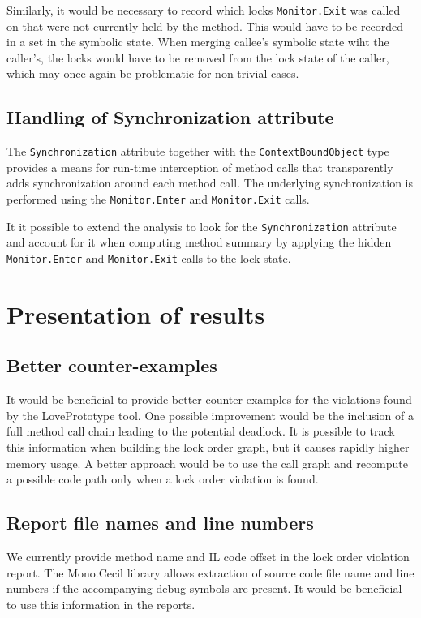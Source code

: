 Similarly, it would be necessary to record which locks \texttt{Monitor.Exit} was called on that were not currently held by the method. This would have to be recorded in a set in the symbolic state. When merging callee's symbolic state wiht the caller's, the locks would have to be removed from the lock state of the caller, which may once again be problematic for non-trivial cases.

\subsection{Handling of Synchronization attribute}

The \texttt{Synchronization} attribute together with the \texttt{ContextBoundObject} type provides a means for run-time interception of method calls that transparently adds synchronization around each method call. The underlying synchronization is performed using the \texttt{Monitor.Enter} and \texttt{Monitor.Exit} calls.

It it possible to extend the analysis to look for the \texttt{Synchronization} attribute and account for it when computing method summary by applying the hidden \texttt{Monitor.Enter} and \texttt{Monitor.Exit} calls to the lock state. 




\section{Presentation of results}

\subsection{Better counter-examples}

It would be beneficial to provide better counter-examples for the violations found by the LovePrototype tool. One possible improvement would be the inclusion of a full method call chain leading to the potential deadlock. It is possible to track this information when building the lock order graph, but it causes rapidly higher memory usage. A better approach would be to use the call graph and recompute a possible code path only when a lock order violation is found.

\subsection{Report file names and line numbers}

We currently provide method name and IL code offset in the lock order violation report. The Mono.Cecil library allows extraction of source code file name and line numbers if the accompanying debug symbols are present. It would be beneficial to use this information in the reports.